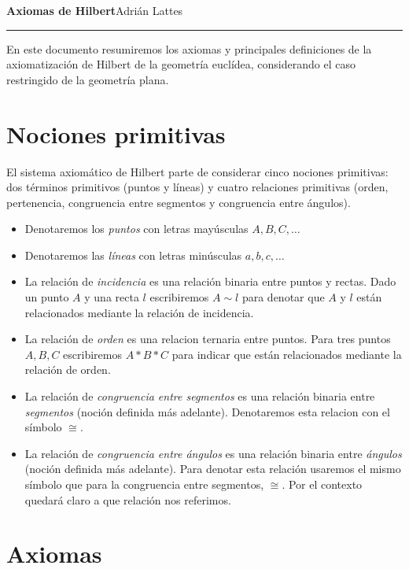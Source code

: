 \documentclass[12pt, spanish]{article}
\theoremstyle{axstyle}
\theoremstyle{axbstyle}
\begin{document}
\selectfont

{ \Large\textbf{Axiomas de Hilbert}\hfill Adrián Lattes} \noindent\rule{17cm}{1pt}
\vspace*{1em}


En este documento resumiremos los axiomas y principales definiciones de la
axiomatización de Hilbert de la geometría euclídea, considerando el caso
restringido de la geometría plana.

\section{Nociones primitivas}

El sistema axiomático de Hilbert parte de considerar cinco nociones primitivas:
dos términos primitivos (puntos y líneas) y cuatro relaciones primitivas (orden,
pertenencia, congruencia entre segmentos y congruencia entre ángulos).

\begin{itemize}
    \item Denotaremos los \textit{puntos} con letras mayúsculas $A,B,C,\dots$
    \item Denotaremos las \textit{líneas} con letras minúsculas $a,b,c,\dots$
    \item La relación de \textit{incidencia} es una relación binaria entre
        puntos y rectas. Dado un punto $A$ y una recta $l$ escribiremos $A\sim
        l$ para denotar que $A$ y $l$ están relacionados mediante la relación de
        incidencia.
    \item La relación de \textit{orden} es una relacion ternaria entre puntos.
        Para tres puntos $A, B, C$ escribiremos $A * B * C$ para indicar que 
        están relacionados mediante la relación de orden.
    \item La relación de \textit{congruencia entre segmentos} es una relación
        binaria entre \textit{segmentos} (noción definida más adelante).
        Denotaremos esta relacion con el símbolo $\cong$.
    \item La relación de \textit{congruencia entre ángulos} es una relación
        binaria entre \textit{ángulos} (noción definida más adelante). Para
        denotar esta relación usaremos el mismo símbolo que para la congruencia
        entre segmentos, $\cong$. Por el contexto quedará claro a que relación
        nos referimos.
\end{itemize}

\section{Axiomas}
\end{document}

